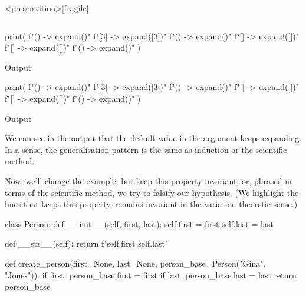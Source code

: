 \begin{description}
    \begin{frame}<presentation>[fragile]
      \begin{example}[experiment3.py]
      \inputminted{python}{examples/experiment3.py}
      \end{example}
    \end{frame}

    \begin{minipage}[t]{0.45\columnwidth}
      \begin{pyblock}[default1]
print(
  f"()  -> {expand()}\n"
  f"[3] -> {expand([3])}\n"
  f"()  -> {expand()}\n"
  f"[]  -> {expand([])}\n"
  f"[]  -> {expand([])}\n"
  f"()  -> {expand()}\n"
)
      \end{pyblock}
      \begin{block}{Output}\printpythontex[verbatim]\end{block}
    \end{minipage}
    \hfill
    \begin{minipage}[t]{0.45\columnwidth}
      \begin{pyblock}[default2]
print(
  f"()  -> {expand()}\n"
  f"[3] -> {expand([3])}\n"
  f"()  -> {expand()}\n"
  f"[]  -> {expand([])}\n"
  f"[]  -> {expand([])}\n"
  f"()  -> {expand()}\n"
)
      \end{pyblock}
      \begin{block}{Output}\printpythontex[verbatim][highlightlines={1,3,6}]\end{block}
    \end{minipage}

    We can see in the output that the default value in the argument keeps 
    expanding.
    In a sense, the generalisation pattern is the same as induction or the 
    scientific method.

    Now, we'll change the example, but keep this property invariant;
    or, phrased in terms of the scientific method, we try to falsify our 
    hypothesis.
    (We highlight the lines that keeps this property, \ie remains invariant in 
    the variation theoretic sense.)
    \begin{pyblock}[default1][highlightlines={10-12}]
class Person:
  def __init__(self, first, last):
    self.first = first
    self.last = last

  def __str__(self):
    return f"{self.first} {self.last}"

def create_person(first=None, last=None,
                  person_base=Person("Gina", "Jones")):
  if first: person_base.first = first
  if last: person_base.last = last
  return person_base


\end{pyblock}
\end{description}
